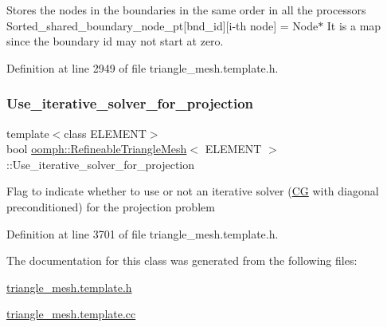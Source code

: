 Stores the nodes in the boundaries in the same order in all the processors Sorted\+\_\+shared\+\_\+boundary\+\_\+node\+\_\+pt\mbox{[}bnd\+\_\+id\mbox{]}\mbox{[}i-\/th node\mbox{]} = Node$\ast$ It is a map since the boundary id may not start at zero. 



Definition at line 2949 of file triangle\+\_\+mesh.\+template.\+h.

\mbox{\label{classoomph_1_1RefineableTriangleMesh_a6b38d79f86053e7acb8f92efe06d9c9a}} 
\subsubsection{\texorpdfstring{Use\+\_\+iterative\+\_\+solver\+\_\+for\+\_\+projection}{Use\_iterative\_solver\_for\_projection}}
{\footnotesize\ttfamily template$<$class E\+L\+E\+M\+E\+NT$>$ \\
bool \hyperlink{classoomph_1_1RefineableTriangleMesh}{oomph\+::\+Refineable\+Triangle\+Mesh}$<$ E\+L\+E\+M\+E\+NT $>$\+::Use\+\_\+iterative\+\_\+solver\+\_\+for\+\_\+projection\hspace{0.3cm}{\ttfamily [protected]}}

Flag to indicate whether to use or not an iterative solver (\hyperlink{classoomph_1_1CG}{CG} with diagonal preconditioned) for the projection problem 

Definition at line 3701 of file triangle\+\_\+mesh.\+template.\+h.



The documentation for this class was generated from the following files\+:\begin{DoxyCompactItemize}
\item 
\hyperlink{triangle__mesh_8template_8h}{triangle\+\_\+mesh.\+template.\+h}\item 
\hyperlink{triangle__mesh_8template_8cc}{triangle\+\_\+mesh.\+template.\+cc}\end{DoxyCompactItemize}
